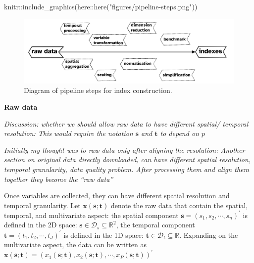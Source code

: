\documentclass[
  letterpaper,
  DIV=11,
  numbers=noendperiod]{scrartcl}
\newenvironment{Shaded}{\begin{snugshade}}{\end{snugshade}}
\newcommand{\FunctionTok}[1]{\textcolor[rgb]{0.28,0.35,0.67}{#1}}
\newcommand{\NormalTok}[1]{\textcolor[rgb]{0.00,0.23,0.31}{#1}}
\newcommand{\SpecialCharTok}[1]{\textcolor[rgb]{0.37,0.37,0.37}{#1}}
\newcommand{\StringTok}[1]{\textcolor[rgb]{0.13,0.47,0.30}{#1}}
\begin{document}
\begin{Shaded}
\begin{Highlighting}[]
\NormalTok{knitr}\SpecialCharTok{::}\FunctionTok{include\_graphics}\NormalTok{(here}\SpecialCharTok{::}\FunctionTok{here}\NormalTok{(}\StringTok{"figures/pipeline{-}steps.png"}\NormalTok{))}
\end{Highlighting}
\end{Shaded}

\begin{figure}[H]

{\centering \includegraphics[width=1\textwidth,height=0.9\textheight]{../figures/pipeline-steps.png}

}

\caption{\label{fig-pipeline-steps}Diagram of pipeline steps for index
construction.}

\end{figure}

\textbf{Raw data}

\emph{Discussion: whether we should allow raw data to have different
spatial/ temporal resolution: This would require the notation
\(\mathbf{s}\) and \(\mathbf{t}\) to depend on \(p\)}

\emph{Initially my thought was to raw data only after aligning the
resolution: Another section on original data directly downloaded, can
have different spatial resolution, temporal granularity, data quality
problem. After processing them and align them together they become the
``raw data''}

Once variables are collected, they can have different spatial resolution
and temporal granularity. Let \(\mathbf{x}(\mathbf{s};\mathbf{t})\)
denote the raw data that contain the spatial, temporal, and multivariate
aspect: the spatial component
\(\mathbf{s} = (s_1, s_2, \cdots, s_n)^\prime\) is defined in the 2D
space: \(\mathbf{s} \in \mathcal{D}_s \subseteq \mathbb{R}^2\), the
temporal component \(\mathbf{t} = (t_1, t_2, \cdots, t_J)^\prime\) is
defined in the 1D space:
\(\mathbf{t} \in \mathcal{D}_t \subseteq \mathbb{R}\). Expanding on the
multivariate aspect, the data can be written as
\(\mathbf{x}(\mathbf{s}; \mathbf{t}) = (x_1(\mathbf{s}; \mathbf{t}), x_2(\mathbf{s}; \mathbf{t}), \cdots, x_P(\mathbf{s}; \mathbf{t}))^\prime\)
\end{document}
